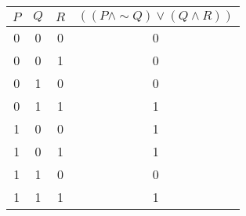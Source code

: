 \begin{tabular}{|c|c|c||c|}
\hline
$ P $ & $ Q $ & $ R $ & $ ((P \wedge  \sim Q) \vee (Q \wedge R)) $ \\
\hline
0 & 0 & 0 & 0 \\
0 & 0 & 1 & 0 \\
0 & 1 & 0 & 0 \\
0 & 1 & 1 & 1 \\
1 & 0 & 0 & 1 \\
1 & 0 & 1 & 1 \\
1 & 1 & 0 & 0 \\
1 & 1 & 1 & 1 \\
\hline
\end{tabular}
\label{table:tt1}
